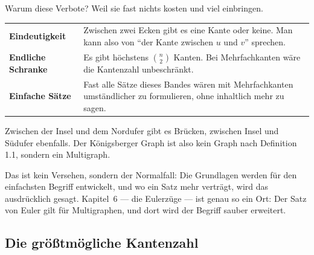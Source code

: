 Warum diese Verbote? Weil sie fast nichts kosten und viel einbringen.

\begin{merksatz}
\begin{center}
\renewcommand{\arraystretch}{1.5}
\begin{tabular}{@{}P{2.8cm}P{5.8cm}@{}}
\toprule
\textbf{Eindeutigkeit} & Zwischen zwei Ecken gibt es eine Kante oder keine. Man kann also von \enquote{der Kante zwischen $u$ und $v$} sprechen.\\
\textbf{Endliche Schranke} & Es gibt höchstens $\binom{n}{2}$ Kanten. Bei Mehrfachkanten wäre die Kantenzahl unbeschränkt.\\
\textbf{Einfache Sätze} & Fast alle Sätze dieses Bandes wären mit Mehrfachkanten umständlicher zu formulieren, ohne inhaltlich mehr zu sagen.\\
\bottomrule
\end{tabular}
\end{center}
\end{merksatz}

\begin{warnung}
Zwischen der Insel und dem Nordufer gibt es  Brücken, zwischen Insel und Südufer ebenfalls. Der Königsberger Graph ist also kein Graph nach Definition 1.1, sondern ein Multigraph.

Das ist kein Versehen, sondern der Normalfall: Die Grundlagen werden für den einfachsten Begriff entwickelt, und wo ein Satz mehr verträgt, wird das ausdrücklich gesagt. Kapitel~6 --- die Eulerzüge --- ist genau so ein Ort: Der Satz von Euler gilt für Multigraphen, und dort wird der Begriff sauber erweitert.

\begin{center}
\begin{minipage}{0.88\textwidth}
\end{minipage}
\end{center}
\end{warnung}

\subsection*{Die größtmögliche Kantenzahl}

